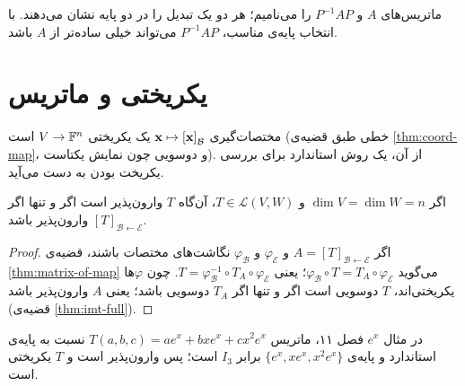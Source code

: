 \begin{center}
\end{center}

ماتریس‌های $A$ و $P^{-1}AP$ را  می‌نامیم؛ هر دو یک تبدیل را در دو پایه نشان می‌دهند. با انتخاب پایه‌ی مناسب، $P^{-1}AP$ می‌تواند خیلی ساده‌تر از $A$ باشد.

\section{یکریختی و ماتریس}

مختصات‌گیری $\mathbf{x}\mapsto\left[\mathbf{x}\right]_{\mathcal{B}}$ یک یکریختی  $V\to\mathbb{F}^n$ است (خطی طبق قضیه‌ی \ref{thm:coord-map}، و دوسویی  چون نمایش یکتاست). از آن، یک روش استاندارد برای بررسی یکریخت  بودن به دست می‌آید.

\begin{theorem}\label{thm:matrix-invertible-map}
اگر $\dim V=\dim W=n$ و $T\in\mathcal{L}(V,W)$، آن‌گاه $T$ وارون‌پذیر است اگر و تنها اگر $[T]_{\mathcal{B}\leftarrow\mathcal{E}}$ وارون‌پذیر باشد.
\end{theorem}
\begin{proof}
اگر $A=[T]_{\mathcal{B}\leftarrow\mathcal{E}}$ و $\varphi_{\mathcal{E}}$ و $\varphi_{\mathcal{B}}$ نگاشت‌های مختصات باشند، قضیه‌ی \ref{thm:matrix-of-map} می‌گوید $\varphi_{\mathcal{B}}\circ T=T_A\circ\varphi_{\mathcal{E}}$؛ یعنی $T=\varphi_{\mathcal{B}}^{-1}\circ T_A\circ\varphi_{\mathcal{E}}$. چون $\varphi$ها یکریختی‌اند، $T$ دوسویی است اگر و تنها اگر $T_A$ دوسویی باشد؛ یعنی $A$ وارون‌پذیر باشد (قضیه‌ی \ref{thm:imt-full}).
\end{proof}

\begin{example}
در مثال $e^x$ فصل ۱۱، ماتریس $T(a,b,c)=ae^x+bxe^x+cx^2e^x$ نسبت به پایه‌ی استاندارد و پایه‌ی $\{e^x,xe^x,x^2e^x\}$ برابر $I_3$ است؛ پس وارون‌پذیر است و $T$ یکریختی است.
\end{example}

